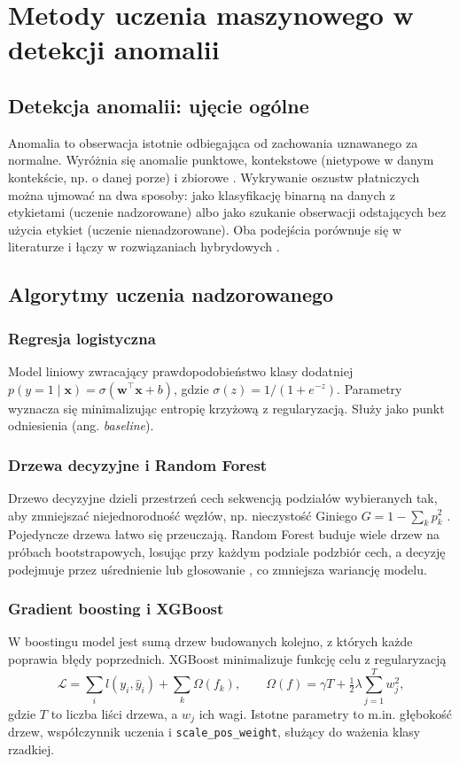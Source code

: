 \chapter{Metody uczenia maszynowego w detekcji anomalii}
\label{ch:ml}

\section{Detekcja anomalii: ujęcie ogólne}
Anomalia to obserwacja istotnie odbiegająca od zachowania uznawanego za normalne. Wyróżnia się anomalie punktowe, kontekstowe (nietypowe w danym kontekście, np. o danej porze) i zbiorowe \cite{chandola2009}. Wykrywanie oszustw płatniczych można ujmować na dwa sposoby: jako klasyfikację binarną na danych z etykietami (uczenie nadzorowane) albo jako szukanie obserwacji odstających bez użycia etykiet (uczenie nienadzorowane). Oba podejścia porównuje się w literaturze \cite{niu2019} i łączy w rozwiązaniach hybrydowych \cite{carcillo2019}.

\section{Algorytmy uczenia nadzorowanego}
\subsection{Regresja logistyczna}
Model liniowy zwracający prawdopodobieństwo klasy dodatniej $p(y{=}1\mid\mathbf{x})=\sigma(\mathbf{w}^\top\mathbf{x}+b)$, gdzie $\sigma(z)=1/(1+e^{-z})$. Parametry wyznacza się minimalizując entropię krzyżową z regularyzacją. Służy jako punkt odniesienia (ang. \emph{baseline}).

\subsection{Drzewa decyzyjne i Random Forest}
Drzewo decyzyjne dzieli przestrzeń cech sekwencją podziałów wybieranych tak, aby zmniejszać niejednorodność węzłów, np. nieczystość Giniego $G=1-\sum_k p_k^2$ \cite{breiman1984}. Pojedyncze drzewa łatwo się przeuczają. Random Forest buduje wiele drzew na próbach bootstrapowych, losując przy każdym podziale podzbiór cech, a decyzję podejmuje przez uśrednienie lub głosowanie \cite{breiman2001}, co zmniejsza wariancję modelu.

\subsection{Gradient boosting i XGBoost}
W boostingu model jest sumą drzew budowanych kolejno, z których każde poprawia błędy poprzednich. XGBoost minimalizuje funkcję celu z regularyzacją \cite{chen2016}
\begin{equation}
  \mathcal{L}=\sum_i l(y_i,\hat{y}_i)+\sum_k \Omega(f_k),\qquad \Omega(f)=\gamma T+\tfrac{1}{2}\lambda\sum_{j=1}^{T}w_j^2,
\end{equation}
gdzie $T$ to liczba liści drzewa, a $w_j$ ich wagi. Istotne parametry to m.in. głębokość drzew, współczynnik uczenia i \texttt{scale\_pos\_weight}, służący do ważenia klasy rzadkiej.

